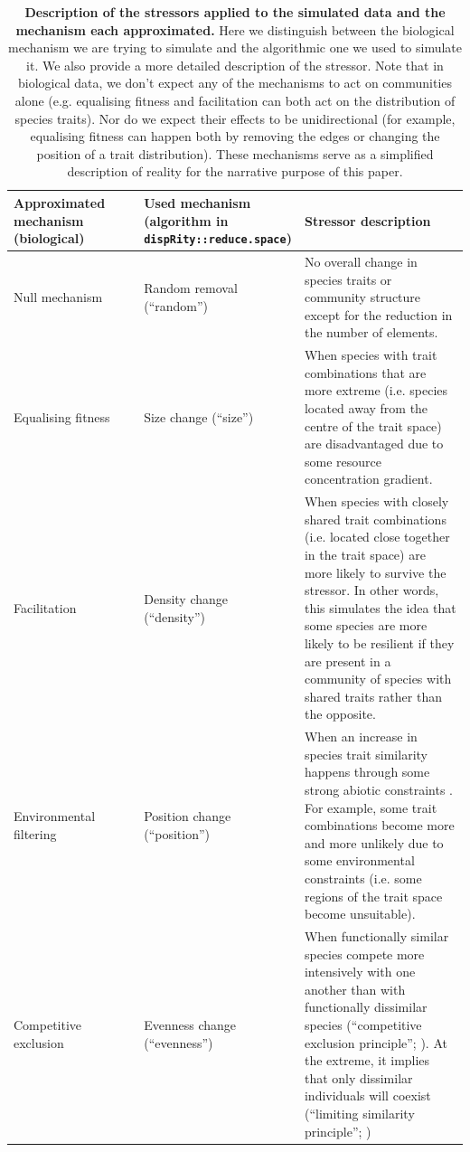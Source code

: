 \documentclass[12pt,letterpaper]{article}
\begin{document}
\begin{table}
\center
\scriptsize
\begin{tabular}{p{0.3\linewidth}|p{0.3\linewidth}|p{0.4\linewidth}}
\textbf{Approximated mechanism (biological)} & \textbf{Used mechanism (algorithm in \texttt{dispRity::reduce.space})} & \textbf{Stressor description}\\
\hline
  Null mechanism & Random removal (``random'') & No overall change in species traits or community structure except for the reduction in the number of elements.\\
  Equalising fitness & Size change (``size'') & When species with trait combinations that are more extreme (i.e. species located away from the centre of the trait space) are disadvantaged due to some resource concentration gradient. \\
  Facilitation & Density change (``density'') & When species with closely shared trait combinations (i.e. located close together in the trait space) are more likely to survive the stressor. In other words, this simulates the idea that some species are more likely to be resilient if they are present in a community of species with shared traits rather than the opposite.\\
  Environmental filtering & Position change (``position'') & When an increase in species trait similarity happens through some strong abiotic constraints \citep{cornwell2006trait}. For example, some trait combinations become more and more unlikely due to some environmental constraints (i.e. some regions of the trait space become unsuitable).\\
  Competitive exclusion & Evenness change (``evenness'') & When functionally similar species compete more intensively with one another than with functionally dissimilar species (``competitive exclusion principle''; \citealt{hardin1960competitive}). At the extreme, it implies that only dissimilar individuals will coexist (``limiting similarity principle''; \citealt{macarthur1967limiting})\\

    \end{tabular}
    \caption{\scriptsize{\textbf{Description of the stressors applied to the simulated data and the mechanism each approximated.} Here we distinguish between the biological mechanism we are trying to simulate and the algorithmic one we used to simulate it. We also provide a more detailed description of the stressor. Note that in biological data, we don't expect any of the mechanisms to act on communities alone (e.g. equalising fitness and facilitation can both act on the distribution of species traits). Nor do we expect their effects to be unidirectional (for example, equalising fitness can happen both by removing the edges or changing the position of a trait distribution). These mechanisms serve as a simplified description of reality for the narrative purpose of this paper.}
}
    \label{Tab:mechanisms}
\end{table}
\end{document}
